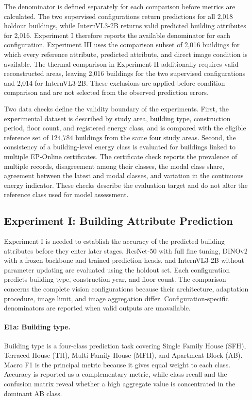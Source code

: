 The denominator is defined separately for each comparison before metrics are calculated. The two supervised configurations return predictions for all 2,018 holdout buildings, while InternVL3-2B returns valid predicted building attributes for 2,016. Experiment I therefore reports the available denominator for each configuration. Experiment III uses the comparison subset of 2,016 buildings for which every reference attribute, predicted attribute, and direct image condition is available. The thermal comparison in Experiment II additionally requires valid reconstructed areas, leaving 2,016 buildings for the two supervised configurations and 2,014 for InternVL3-2B. These exclusions are applied before condition comparison and are not selected from the observed prediction errors.

Two data checks define the validity boundary of the experiments. First, the experimental dataset is described by study area, building type, construction period, floor count, and registered energy class, and is compared with the eligible reference set of 124,784 buildings from the same four study areas. Second, the consistency of a building-level energy class is evaluated for buildings linked to multiple EP-Online certificates. The certificate check reports the prevalence of multiple records, disagreement among their classes, the modal class share, agreement between the latest and modal classes, and variation in the continuous energy indicator. These checks describe the evaluation target and do not alter the reference class used for model assessment.

\subsection{Experiment I: Building Attribute Prediction}
\label{sec:prediction_tasks_metrics}

Experiment I is needed to establish the accuracy of the predicted building attributes before they enter later stages. ResNet-50 with full fine tuning, DINOv2 with a frozen backbone and trained prediction heads, and InternVL3-2B without parameter updating are evaluated using the holdout set. Each configuration predicts building type, construction year, and floor count. The comparison concerns the complete vision configurations because their architecture, adaptation procedure, image limit, and image aggregation differ. Configuration-specific denominators are reported when valid outputs are unavailable.

\paragraph{E1a: Building type.}
Building type is a four-class prediction task covering Single Family House (SFH), Terraced House (TH), Multi Family House (MFH), and Apartment Block (AB). Macro F1 is the principal metric because it gives equal weight to each class. Accuracy is reported as a complementary metric, while class recall and the confusion matrix reveal whether a high aggregate value is concentrated in the dominant AB class.


